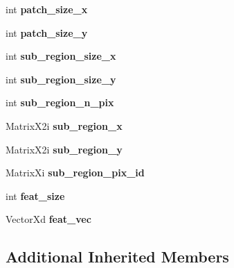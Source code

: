 \begin{DoxyCompactItemize}
\item 
\hypertarget{classLKLD_a70a208ecaa2ca54dafe1fd40a8bc6c55}{int {\bfseries patch\-\_\-size\-\_\-x}}\label{classLKLD_a70a208ecaa2ca54dafe1fd40a8bc6c55}

\item 
\hypertarget{classLKLD_a983eeef3f1e3167e60376991ba5679cd}{int {\bfseries patch\-\_\-size\-\_\-y}}\label{classLKLD_a983eeef3f1e3167e60376991ba5679cd}

\item 
\hypertarget{classLKLD_ad660d2727bf47aeba8b67b049b89ecbe}{int {\bfseries sub\-\_\-region\-\_\-size\-\_\-x}}\label{classLKLD_ad660d2727bf47aeba8b67b049b89ecbe}

\item 
\hypertarget{classLKLD_a60a704e135f475c08e82ac7ce1762457}{int {\bfseries sub\-\_\-region\-\_\-size\-\_\-y}}\label{classLKLD_a60a704e135f475c08e82ac7ce1762457}

\item 
\hypertarget{classLKLD_ae24b172c810a835b985327027d6ab651}{int {\bfseries sub\-\_\-region\-\_\-n\-\_\-pix}}\label{classLKLD_ae24b172c810a835b985327027d6ab651}

\item 
\hypertarget{classLKLD_a6a2e86a1bc4e234adf35114407eea1c7}{Matrix\-X2i {\bfseries sub\-\_\-region\-\_\-x}}\label{classLKLD_a6a2e86a1bc4e234adf35114407eea1c7}

\item 
\hypertarget{classLKLD_acd714c5686799268b223ad0783faf9e2}{Matrix\-X2i {\bfseries sub\-\_\-region\-\_\-y}}\label{classLKLD_acd714c5686799268b223ad0783faf9e2}

\item 
\hypertarget{classLKLD_a90edb795da5c03f63d2c59b0b64173af}{Matrix\-Xi {\bfseries sub\-\_\-region\-\_\-pix\-\_\-id}}\label{classLKLD_a90edb795da5c03f63d2c59b0b64173af}

\item 
\hypertarget{classLKLD_aa8c5f5e3351a9008f1e2d6102dba917b}{int {\bfseries feat\-\_\-size}}\label{classLKLD_aa8c5f5e3351a9008f1e2d6102dba917b}

\item 
\hypertarget{classLKLD_a26da1d890d9043f6995c3ece48226f5d}{Vector\-Xd {\bfseries feat\-\_\-vec}}\label{classLKLD_a26da1d890d9043f6995c3ece48226f5d}

\end{DoxyCompactItemize}
\subsection*{Additional Inherited Members}


